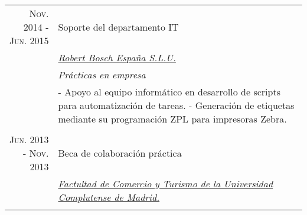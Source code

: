 \documentclass[a4paper,10pt]{article}
\begin{document}
\begin{tabular}{r|p{11cm}}
 	\textsc{Nov. 2014 - Jun. 2015} & 	Soporte del departamento IT \\&
	\emph{\href{https://www.grupo-bosch.es/}{Robert Bosch España S.L.U.}}\\&
	\emph{Prácticas en empresa}\\&
	\footnotesize{
		- Apoyo al equipo informático en desarrollo de scripts para automatización de tareas.	\newline
		- Generación de etiquetas mediante su programación ZPL para impresoras Zebra.
	}
	\\\multicolumn{2}{c}{} \\

 	\textsc{Jun. 2013 - Nov. 2013} & 	Beca de colaboración práctica \\&
	\emph{\href{https://comercioyturismo.ucm.es/}{Factultad de Comercio y Turismo de la Universidad Complutense de Madrid.}}\\&

\end{tabular}

\end{document}
